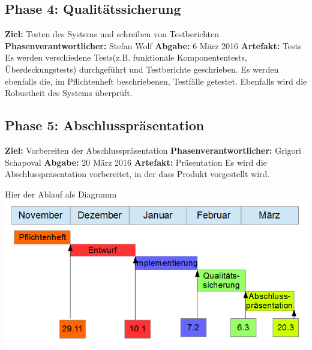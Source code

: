 \subsection{Phase 4: Qualitätssicherung}
\textbf{Ziel:} Testen des Systems und schreiben von Testberichten \newline
\textbf{Phasenverantwortlicher:} Stefan Wolf  \newline
\textbf{Abgabe:} 6 März 2016 \newline
\textbf{Artefakt:} Tests \newline
Es werden verschiedene Tests(z.B. funktionale Komponententests, Überdeckungstests) durchgeführt und Testberichte geschrieben. Es werden ebenfalls die, im Pflichtenheft beschriebenen, Testfälle getestet. Ebenfalls wird die Robustheit des Systems überprüft.

\subsection{Phase 5: Abschlusspräsentation}
\textbf{Ziel:} Vorbereiten der Abschlusspräsentation \newline
\textbf{Phasenverantwortlicher:} Grigori Schapoval  \newline
\textbf{Abgabe:} 20 März 2016 \newline
\textbf{Artefakt:} Präsentation \newline
Es wird die Abschlusspräsentation vorbereitet, in der dass Produkt vorgestellt wird.

Hier der Ablauf als Diagramm
\includegraphics{img/ablauf}
